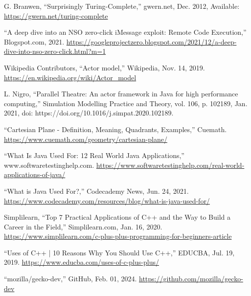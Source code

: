 \documentclass[12pt]{report} %
\begin{document}
\begin{singlespace}
\begin{thebibliography}{}
             G. Branwen, “Surprisingly Turing-Complete,” gwern.net, Dec. 2012, Available: \href{https://gwern.net/turing-complete}{https://gwern.net/turing-complete}

             “A deep dive into an NSO zero-click iMessage exploit: Remote Code Execution,” Blogspot.com, 2021. \href{https://googleprojectzero.blogspot.com/2021/12/a-deep-dive-into-nso-zero-click.html?m=1}{https://googleprojectzero.blogspot.com/2021/12/a-deep-dive-into-nso-zero-click.html?m=1}

             Wikipedia Contributors, “Actor model,” Wikipedia, Nov. 14, 2019. \href{https://en.wikipedia.org/wiki/Actor_model}{https://en.wikipedia.org/wiki/Actor\_model}
           
             L. Nigro, “Parallel Theatre: An actor framework in Java for high performance computing,” Simulation Modelling Practice and Theory, vol. 106, p. 102189, Jan. 2021, doi: https://doi.org/10.1016/j.simpat.2020.102189. 

             “Cartesian Plane - Definition, Meaning, Quadrants, Examples,” Cuemath. \href{https://www.cuemath.com/geometry/cartesian-plane/}{https://www.cuemath.com/geometry/cartesian-plane/}

             “What Is Java Used For: 12 Real World Java Applications,” www.softwaretestinghelp.com. \href{https://www.softwaretestinghelp.com/real-world-applications-of-java/}{https://www.softwaretestinghelp.com/real-world-applications-of-java/}

             “What is Java Used For?,” Codecademy News, Jun. 24, 2021. \href{https://www.codecademy.com/resources/blog/what-is-java-used-for/}{https://www.codecademy.com/resources/blog/what-is-java-used-for/}

             Simplilearn, “Top 7 Practical Applications of C++ and the Way to Build a Career in the Field,” Simplilearn.com, Jan. 16, 2020. \href{https://www.simplilearn.com/c-plus-plus-programming-for-beginners-article}{https://www.simplilearn.com/c-plus-plus-programming-for-beginners-article}

             “Uses of C++ | 10 Reasons Why You Should Use C++,” EDUCBA, Jul. 19, 2019. \href{https://www.educba.com/uses-of-c-plus-plus/}{https://www.educba.com/uses-of-c-plus-plus/}

             “mozilla/gecko-dev,” GitHub, Feb. 01, 2024. \href{https://github.com/mozilla/gecko-dev}{https://github.com/mozilla/gecko-dev}


\end{thebibliography}
\end{singlespace}
\end{document}
